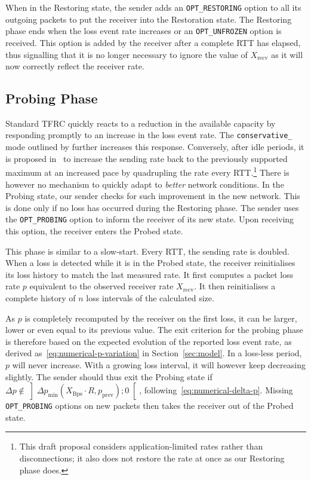 \documentclass[twocolumn]{nictatechreport}
\begin{document}
When in the Restoring state, the sender adds an \verb#OPT_RESTORING# option to
all its outgoing packets to put the receiver into the Restoration state.  The
Restoring phase ends when the loss event rate increases or an
\verb#OPT_UNFROZEN# option is received. This option is added by the receiver
after a complete RTT has elapsed, thus signalling that it is no longer
necessary to ignore the value of $X_\mathrm{recv}$ as it will now correctly
reflect the receiver rate.

\subsection{Probing Phase} 

Standard TFRC quickly reacts to a reduction in the available capacity by
responding promptly to an increase in the loss event rate. The
\verb!conservative_! mode outlined by
\cite{2001bansal_slowly_responsive_congestion_control} further increases this
response. Conversely, after idle periods, it is proposed
in~\cite{draft-ietf-dccp-tfrc-faster-restart-06} to increase the sending rate
back to the previously supported maximum at an increased pace by quadrupling the
rate every RTT.\footnote{This draft proposal considers application-limited rates
rather than disconnections; it also does not restore the rate at once as our
Restoring phase does.} There is however no mechanism to quickly adapt to
\emph{better} network conditions. In the Probing state, our sender checks for
such improvement in the new network. This is done only if no loss has occurred
during the Restoring phase. The sender uses the \verb#OPT_PROBING# option to
inform the receiver of its new state. Upon receiving this option, the receiver
enters the Probed state.

This phase is similar to a slow-start. Every RTT, the sending rate is
doubled.  When a loss is detected while it is in the Probed state, the receiver
reinitialises its loss history to match the last measured rate. It first
computes a packet loss rate $p$ equivalent to the observed receiver rate
$X_\mathrm{recv}$. It then reinitialises a complete history of $n$ loss
intervals of the calculated size.

As $p$ is completely recomputed by the receiver on the first loss, it can be
larger, lower or even equal to its previous value. The exit criterion for the
probing phase is therefore based on the expected evolution of the reported loss
event rate, as derived as~\eqref{eq:numerical-p-variation} in
Section~\ref{sec:model}. In a loss-less period, $p$ will never increase. With a
growing loss interval, it will however keep decreasing slightly. The sender
should thus exit the Probing state if
$\Delta p \notin \left] \Delta p_\mathrm{min}(X_\mathrm{Bps} \cdot R, p_\mathrm{prev}); 0 \right[$, 
following~\eqref{eq:numerical-delta-p}. Missing \verb#OPT_PROBING#
options on new packets then takes the receiver out of the Probed state.
\end{document}
